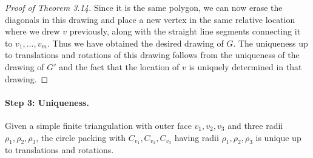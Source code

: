 \begin{proof}[Proof of Theorem 3.14]
Since it is the same polygon, we can now erase the diagonals in this drawing and place a new vertex in the same relative location where we drew $v$ previously, along with the straight line segments connecting it to $v_1,\ldots,v_m$. Thus we have obtained the desired drawing of $G$. The uniqueness up to translations and rotations of this drawing follows from the uniqueness of the drawing of $G'$ and the fact that the location of $v$ is uniquely determined in that drawing.
\end{proof}

\paragraph{Step 3: Uniqueness.}
\begin{theorem}
Given a simple finite triangulation with outer face $v_1,v_2,v_3$ and three radii $\rho_1,\rho_2,\rho_3$, the circle packing with $C_{v_1},C_{v_2},C_{v_3}$ having radii $\rho_1,\rho_2,\rho_3$ is unique up to translations and rotations.
\end{theorem}
